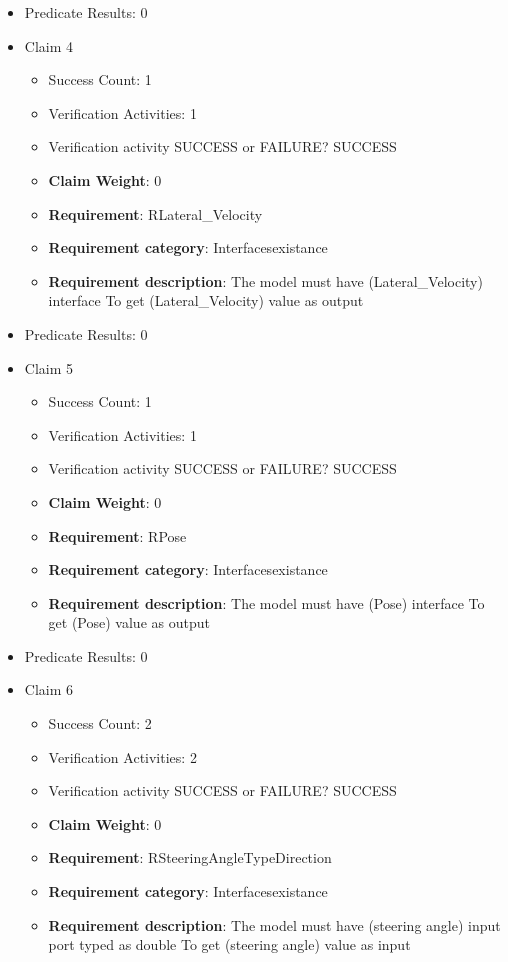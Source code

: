 \documentclass{article}
\begin{document}
\begin{itemize}
\begin{itemize}
				\end{itemize}
				
									    
				\item Predicate Results: 0

  				  \item Claim 4
				\begin{itemize}
			    	\item Success Count: 1 
			    	\item Verification Activities: 1
					\item Verification activity SUCCESS or FAILURE? SUCCESS
					\item \textbf{Claim Weight}: 0
						\item \textbf{Requirement}: RLateral_Velocity 
						\item \textbf{Requirement category}: Interfacesexistance 
						\item \textbf{Requirement description}: The model must have (Lateral_Velocity) interface To get (Lateral_Velocity) value as output
					
				\end{itemize}
				
									    
				\item Predicate Results: 0

  				  \item Claim 5
				\begin{itemize}
			    	\item Success Count: 1 
			    	\item Verification Activities: 1
					\item Verification activity SUCCESS or FAILURE? SUCCESS
					\item \textbf{Claim Weight}: 0
						\item \textbf{Requirement}: RPose 
						\item \textbf{Requirement category}: Interfacesexistance 
						\item \textbf{Requirement description}: The model must have (Pose) interface To get (Pose) value as output
					
				\end{itemize}
				
									    
				\item Predicate Results: 0

  				  \item Claim 6
				\begin{itemize}
			    	\item Success Count: 2 
			    	\item Verification Activities: 2
					\item Verification activity SUCCESS or FAILURE? SUCCESS
					\item \textbf{Claim Weight}: 0
						\item \textbf{Requirement}: RSteeringAngleTypeDirection 
						\item \textbf{Requirement category}: Interfacesexistance 
						\item \textbf{Requirement description}: The model must have (steering angle) input port typed as double To get (steering angle) value as input
					

\end{itemize}
\end{itemize}
\end{document}
